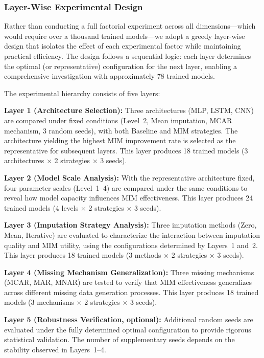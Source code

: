 \documentclass[5p,times]{elsarticle}
\begin{document}
\subsubsection{Layer-Wise Experimental Design}

Rather than conducting a full factorial experiment across all dimensions---which would require over a thousand trained models---we adopt a greedy layer-wise design that isolates the effect of each experimental factor while maintaining practical efficiency. The design follows a sequential logic: each layer determines the optimal (or representative) configuration for the next layer, enabling a comprehensive investigation with approximately 78 trained models.

The experimental hierarchy consists of five layers:

\textbf{Layer 1 (Architecture Selection):} Three architectures (MLP, LSTM, CNN) are compared under fixed conditions (Level~2, Mean imputation, MCAR mechanism, 3 random seeds), with both Baseline and MIM strategies. The architecture yielding the highest MIM improvement rate is selected as the representative for subsequent layers. This layer produces 18 trained models (3 architectures $\times$ 2 strategies $\times$ 3 seeds).

\textbf{Layer 2 (Model Scale Analysis):} With the representative architecture fixed, four parameter scales (Level~1--4) are compared under the same conditions to reveal how model capacity influences MIM effectiveness. This layer produces 24 trained models (4 levels $\times$ 2 strategies $\times$ 3 seeds).

\textbf{Layer 3 (Imputation Strategy Analysis):} Three imputation methods (Zero, Mean, Iterative) are evaluated to characterize the interaction between imputation quality and MIM utility, using the configurations determined by Layers~1 and~2. This layer produces 18 trained models (3 methods $\times$ 2 strategies $\times$ 3 seeds).

\textbf{Layer 4 (Missing Mechanism Generalization):} Three missing mechanisms (MCAR, MAR, MNAR) are tested to verify that MIM effectiveness generalizes across different missing data generation processes. This layer produces 18 trained models (3 mechanisms $\times$ 2 strategies $\times$ 3 seeds).

\textbf{Layer 5 (Robustness Verification, optional):} Additional random seeds are evaluated under the fully determined optimal configuration to provide rigorous statistical validation. The number of supplementary seeds depends on the stability observed in Layers~1--4.
\end{document}
